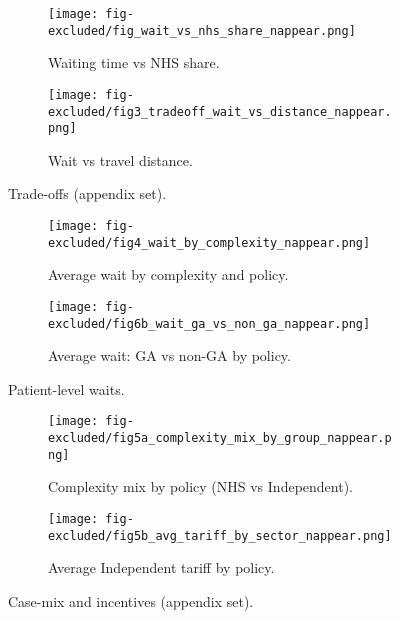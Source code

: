 \documentclass[ %
                    author={Nattanan Nawakitbamrung},
                supervisor={Dr. Sébastien Rochat},
                    degree={MSc},
                     title={Developing and Evaluating the Impact of a Single Patient Treatment List (PTL) for an NHS Integrated Care System},
                  subtitle={},
                      type={},
                      year={2025}]{dissertation}
\begin{document}
\begin{figure}[htbp]
  \centering
  \begin{subfigure}{0.49\linewidth}
    \centering
    \texttt{[image: fig-excluded/fig\_wait\_vs\_nhs\_share\_nappear.png]}
    \caption{Waiting time vs NHS share.}
    \label{fig:app-wait-time-share}
  \end{subfigure}
  \hfill
  \begin{subfigure}{0.49\linewidth}
    \centering
    \texttt{[image: fig-excluded/fig3\_tradeoff\_wait\_vs\_distance\_nappear.png]}
    \caption{Wait vs travel distance.}
    \label{fig:app-tradeoff-wait}
  \end{subfigure}
  \caption{Trade-offs (appendix set).}
  \label{fig:app-tradeoff-panels}
\end{figure}

\FloatBarrier

\begin{figure}[htbp]
  \centering
  \begin{subfigure}{0.46\linewidth}
    \centering
    \texttt{[image: fig-excluded/fig4\_wait\_by\_complexity\_nappear.png]}
    \caption{Average wait by complexity and policy.}
    \label{fig:app-avg-wait-by-comp}
  \end{subfigure}
  \hfill
  \begin{subfigure}{0.52\linewidth}
    \centering
    \texttt{[image: fig-excluded/fig6b\_wait\_ga\_vs\_non\_ga\_nappear.png]}
    \caption{Average wait: GA vs non-GA by policy.}
    \label{fig:app-ga-non-ga}
  \end{subfigure}
  \caption{Patient-level waits.}
  \label{fig:app-patient-waits-panels}
\end{figure}

\begin{figure}[htbp]
  \centering
  \begin{subfigure}{0.49\linewidth}
    \centering
    \texttt{[image: fig-excluded/fig5a\_complexity\_mix\_by\_group\_nappear.png]}
    \caption{Complexity mix by policy (NHS vs Independent).}
    \label{fig:app-comp-mix}
  \end{subfigure}
  \hfill
  \begin{subfigure}{0.49\linewidth}
    \centering
    \texttt{[image: fig-excluded/fig5b\_avg\_tariff\_by\_sector\_nappear.png]}
    \caption{Average Independent tariff by policy.}
    \label{fig:app-avg-tariff}
  \end{subfigure}
  \caption{Case-mix and incentives (appendix set).}
  \label{fig:app-mix-tariff-panels}
\end{figure}
\end{document}
